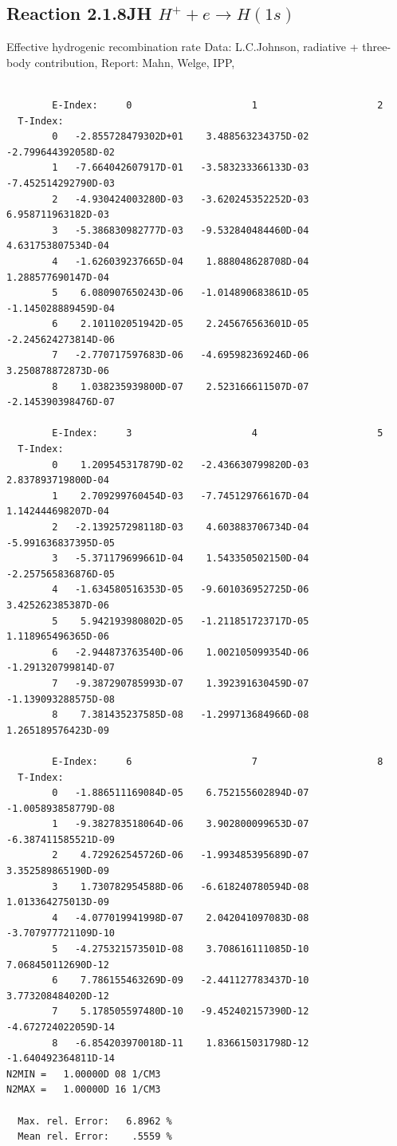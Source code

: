 \documentclass[12pt,dvipdfmx]{article}
\begin{document}
\subsection{
  Reaction 2.1.8JH  $ H^+ + e\rightarrow H(1s) $
}

   Effective hydrogenic recombination rate
   Data: L.C.Johnson, radiative + three-body contribution,
   Report: Mahn, Welge, IPP, \cite{kn:Mahn}


\begin{small}\begin{verbatim}

        E-Index:     0                     1                     2
  T-Index:
        0   -2.855728479302D+01    3.488563234375D-02   -2.799644392058D-02
        1   -7.664042607917D-01   -3.583233366133D-03   -7.452514292790D-03
        2   -4.930424003280D-03   -3.620245352252D-03    6.958711963182D-03
        3   -5.386830982777D-03   -9.532840484460D-04    4.631753807534D-04
        4   -1.626039237665D-04    1.888048628708D-04    1.288577690147D-04
        5    6.080907650243D-06   -1.014890683861D-05   -1.145028889459D-04
        6    2.101102051942D-05    2.245676563601D-05   -2.245624273814D-06
        7   -2.770717597683D-06   -4.695982369246D-06    3.250878872873D-06
        8    1.038235939800D-07    2.523166611507D-07   -2.145390398476D-07

        E-Index:     3                     4                     5
  T-Index:
        0    1.209545317879D-02   -2.436630799820D-03    2.837893719800D-04
        1    2.709299760454D-03   -7.745129766167D-04    1.142444698207D-04
        2   -2.139257298118D-03    4.603883706734D-04   -5.991636837395D-05
        3   -5.371179699661D-04    1.543350502150D-04   -2.257565836876D-05
        4   -1.634580516353D-05   -9.601036952725D-06    3.425262385387D-06
        5    5.942193980802D-05   -1.211851723717D-05    1.118965496365D-06
        6   -2.944873763540D-06    1.002105099354D-06   -1.291320799814D-07
        7   -9.387290785993D-07    1.392391630459D-07   -1.139093288575D-08
        8    7.381435237585D-08   -1.299713684966D-08    1.265189576423D-09

        E-Index:     6                     7                     8
  T-Index:
        0   -1.886511169084D-05    6.752155602894D-07   -1.005893858779D-08
        1   -9.382783518064D-06    3.902800099653D-07   -6.387411585521D-09
        2    4.729262545726D-06   -1.993485395689D-07    3.352589865190D-09
        3    1.730782954588D-06   -6.618240780594D-08    1.013364275013D-09
        4   -4.077019941998D-07    2.042041097083D-08   -3.707977721109D-10
        5   -4.275321573501D-08    3.708616111085D-10    7.068450112690D-12
        6    7.786155463269D-09   -2.441127783437D-10    3.773208484020D-12
        7    5.178505597480D-10   -9.452402157390D-12   -4.672724022059D-14
        8   -6.854203970018D-11    1.836615031798D-12   -1.640492364811D-14
N2MIN =   1.00000D 08 1/CM3
N2MAX =   1.00000D 16 1/CM3

  Max. rel. Error:   6.8962 %
  Mean rel. Error:    .5559 %


\end{verbatim}\end{small}
\end{document}

